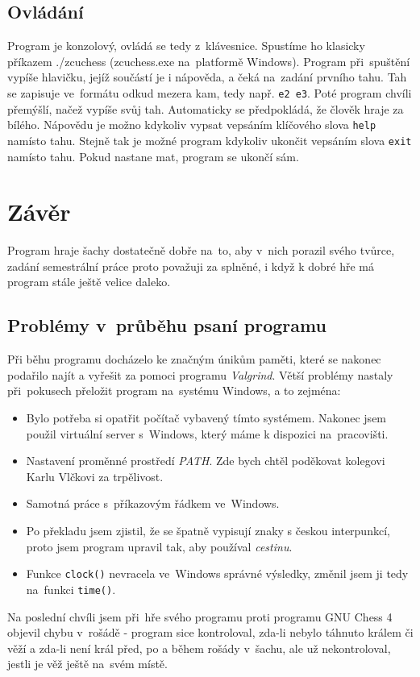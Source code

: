 \documentclass[11pt, titlepage]{article}
\begin{document}
\subsection{Ovládání}

Program je konzolový, ovládá se tedy z~klávesnice. Spustíme ho klasicky příkazem ./zcuchess (zcuchess.exe na~platformě Windows). Program při~spuštění vypíše hlavičku, jejíž součástí je i nápověda, a čeká na~zadání prvního tahu. Tah se zapisuje ve~formátu odkud mezera kam, tedy např. {\tt e2 e3}. Poté program chvíli přemýšlí, načež vypíše svůj tah. Automaticky se předpokládá, že člověk hraje za bílého. Nápovědu je možno kdykoliv vypsat vepsáním klíčového slova {\tt help} namísto tahu. Stejně tak je možné program kdykoliv ukončit vepsáním slova {\tt exit} namísto tahu. Pokud nastane mat, program se ukončí sám.

\section{Závěr}
Program hraje šachy dostatečně dobře na~to, aby v~nich porazil svého tvůrce, zadání semestrální práce proto považuji za splněné, i když k dobré hře má program stále ještě velice daleko.

\subsection{Problémy v~průběhu psaní programu}
Při běhu programu docházelo ke značným únikům paměti, které se nakonec podařilo najít a vyřešit za pomoci programu {\it Valgrind}.
Větší problémy nastaly při~pokusech přeložit program na~systému Windows, a to zejména:
\begin{itemize}
	\item Bylo potřeba si opatřit počítač vybavený tímto systémem. Nakonec jsem použil virtuální server s~Windows, který máme k dispozici na~pracovišti.
	\item Nastavení proměnné prostředí {\it PATH}. Zde bych chtěl poděkovat kolegovi Karlu Vlčkovi za trpělivost.
	\item Samotná práce s~příkazovým řádkem ve~Windows.
	\item Po překladu jsem zjistil, že se špatně vypisují znaky s českou interpunkcí, proto jsem program upravil tak, aby používal {\it cestinu}.
	\item Funkce {\tt clock()} nevracela ve~Windows správné výsledky, změnil jsem ji tedy na~funkci {\tt time()}.
\end{itemize}
Na poslední chvíli jsem při~hře svého programu proti programu GNU Chess 4 objevil chybu v~rošádě - program sice kontroloval, zda-li nebylo táhnuto králem či věží a zda-li není král před, po a během rošády v~šachu, ale už nekontroloval, jestli je věž ještě na~svém místě.
\end{document}

